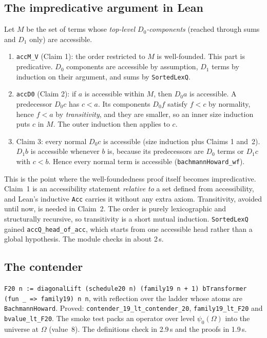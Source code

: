 \documentclass[11pt]{article}
\theoremstyle{definition}
\theoremstyle{remark}
\newcommand{\lean}[1]{\texttt{#1}}
\begin{document}
\subsection{The impredicative argument in Lean}
Let $M$ be the set of terms whose \emph{top-level $D_0$-components} (reached
through sums and $D_1$ only) are accessible.
\begin{enumerate}
\item \lean{accM\_V} (Claim 1): the order restricted to $M$ is well-founded.
  This part is predicative. $D_0$ components are accessible by assumption,
  $D_1$ terms by induction on their argument, and sums by \lean{SortedLexQ}.
\item \lean{accD0} (Claim 2): if $a$ is accessible within $M$, then $D_0a$ is
  accessible. A predecessor $D_0c$ has $c<a$. Its components $D_0f$ satisfy
  $f<c$ by normality, hence $f<a$ by \emph{transitivity}, and they are
  smaller, so an inner size induction puts $c$ in $M$. The outer induction then
  applies to $c$.
\item Claim 3: every normal $D_0c$ is accessible (size induction plus Claims 1
  and~2). $D_1b$ is accessible whenever $b$ is, because its predecessors are
  $D_0$ terms or $D_1c$ with $c<b$. Hence every normal term is accessible
  (\lean{bachmannHoward\_wf}).
\end{enumerate}
This is the point where the well-foundedness proof itself becomes
impredicative. Claim~1 is an accessibility statement \emph{relative to} a set
defined from accessibility, and Lean's inductive \lean{Acc} carries it without
any extra axiom. Transitivity, avoided until now, is needed in Claim~2. The order
is purely lexicographic and structurally recursive, so transitivity is a short
mutual induction. \lean{SortedLexQ} gained \lean{accQ\_head\_of\_acc}, which
starts from one accessible head rather than a global hypothesis. The module
checks in about 2\,s.

\subsection{The contender}
\lean{F20 n := diagonalLift (schedule20 n) (family19 n + 1) bTransformer (fun \_ => family19) n n},
with reflection over the ladder whose atoms are \lean{BachmannHoward}. Proved:
\lean{contender\_19\_lt\_\allowbreak contender\_20}, \lean{family19\_lt\_F20}
and \lean{bvalue\_lt\_F20}. The smoke test packs an operator over level
$\psi_0(\Omega)$ into the universe at $\Omega$ (value~8). The definitions check
in 2.9\,s and the proofs in 1.9\,s.
\end{document}
